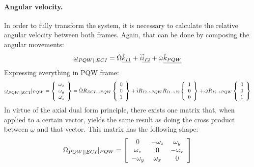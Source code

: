 			\paragraph{Angular velocity. \\}
			\indent In order to fully transform the system, it is necessary to calculate the relative angular velocity between both frames. Again, that can be done by composing the angular movements:
			\[
			\underline{\omega}_{PQW \vert \vert ECI} = \dot{\Omega} \underline{\hat{k}_{I1}} + \dot{i} \underline{\hat{i}_{I2}} + \dot{\omega} \underline{\hat{k}_{PQW}}
			\]
			\indent Expressing everything in PQW frame:
			\[
			\underline{\omega}_{PQW \vert \vert ECI}\rvert_{PQW} = \left\{\begin{array}{c} \omega_x \\ \omega_y \\ \omega_z \end{array}\right\} = \dot{\Omega} R_{ECI\rightarrow PQW} \left\{\begin{array}{c} 0 \\ 0 \\ 1 \end{array}\right\} + \dot{i} R_{I2 \rightarrow PQW}R_{I1 \rightarrow I2} \left\{\begin{array}{c} 1 \\ 0 \\ 0 \end{array}\right\} + \dot{\omega} R_{I2 \rightarrow PQW} \left\{\begin{array}{c} 0 \\ 0 \\ 1 \end{array}\right\}
			\]
			\indent In virtue of the axial dual form principle, there exists one matrix that, when applied to a certain vector, yields the same result as doing the cross product between $\underline{\omega}$ and that vector. This matrix has the following shape:
			\[
			\Omega_{PQW \vert \vert ECI}\rvert_{PQW} = \left[ \begin{array}{ccc}
			0 			& -\omega_z & \omega_y \\
			\omega_z 	& 0 		& -\omega_x \\
			-\omega_y 	& \omega_x 	& 0
			\end{array}\right]
			\]
